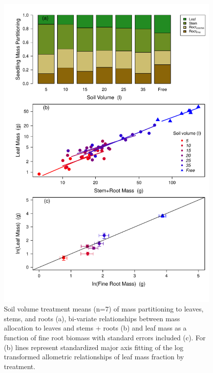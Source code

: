 \documentclass[a4paper]{article}\usepackage[]{graphicx}\usepackage[]{color}
\begin{document}
\begin{figure}[h!]
    \centering
    \includegraphics[width=0.99\textwidth]{massfractions.pdf}
    \caption{Soil volume treatment means (n=7) of mass partitioning to leaves, stems, and roots (a), bi-variate relationships between mass allocation to leaves and stems + roots (b) and leaf mass as a function of fine root biomass with standard errors included (c). For (b) lines represent standardized major axis fitting of the log transformed allometric relationships of leaf mass fraction by treatment.}
    \label{fig:figure4}
\end{figure}
\end{document}

